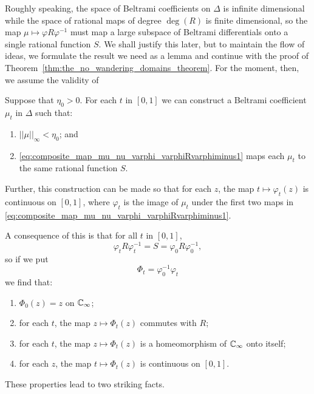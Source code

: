 Roughly speaking, the space of Beltrami coefficients on $\Delta$ is infinite
dimensional while the space of rational maps of degree $\deg(R)$ is finite
dimensional, so the map $\mu \mapsto \varphi R \varphi^{-1}$ must map a large
subspace of Beltrami differentials onto a single rational function $S$. We shall
justify this later, but to maintain the flow of ideas, we formulate the result
we need as a lemma and continue with the proof of
Theorem~\ref{thm:the_no_wandering_domains_theorem}. For the moment, then, we
assume the validity of

\begin{lemma}
    \label{lem:TO_DO_1}
    Suppose that $\eta_0 > 0$. For each $t$ in $[0, 1]$ we can construct a
    Beltrami coefficient $\mu_t$ in $\Delta$ such that:
    \begin{enumerate}[label=(\roman*)]
        \item \label{itm:lemma_to_do_1_a} $||\mu||_\infty < \eta_0$; and
        \item \label{itm:lemma_to_do_1_b}
        \eqref{eq:composite_map_mu_nu_varphi_varphiRvarphiminus1} maps each
        $\mu_t$ to the same rational function $S$.
    \end{enumerate}
    Further, this construction can be made so that for each $z$, the map $t
    \mapsto \varphi_t(z)$ is continuous on $[0, 1]$, where $\varphi_t$ is the
    image of $\mu_t$ under the first two maps in
    \eqref{eq:composite_map_mu_nu_varphi_varphiRvarphiminus1}.
\end{lemma}

A consequence of this is that for all $t$ in $[0, 1]$,
\begin{equation*}
    \varphi_t R \varphi_t^{-1} = S = \varphi_0 R \varphi_0^{-1},
\end{equation*}
so if we put
\begin{equation*}
    \Phi_t = \varphi_0^{-1} \varphi_t
\end{equation*}
we find that:
\begin{enumerate}[label=(\roman*)]
    \item \label{itm:Phi_0_Id} $\Phi_0(z) = z$ on $\mathbb{C}_\infty$;
    \item \label{itm:Phi_commutes_with_R} for each $t$, the map $z \mapsto
    \Phi_t(z)$ commutes with $R$;
    \item \label{itm:Phi_homeomorphism_on_ExtC} for each $t$, the map $z \mapsto
    \Phi_t(z)$ is a homeomorphism of $\mathbb{C}_\infty$ onto itself;
    \item \label{itm:Phi_continuous_on_0_1} for each $z$, the map $t \mapsto
    \Phi_t(z)$ is continuous on $[0, 1]$.
\end{enumerate}
These properties lead to two striking facts.

